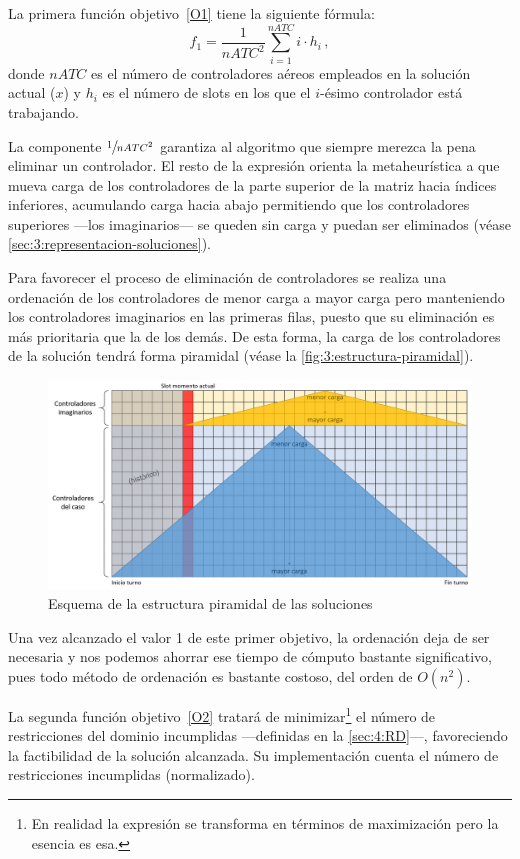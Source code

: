 La primera función objetivo~\ref{O1} tiene la siguiente fórmula:
\[ f_1 = \frac{1}{nATC^2} \sum_{i=1}^{nATC} i\cdot h_i \,, \]
donde $nATC$ es el número de controladores aéreos empleados en la solución actual ($x$) y $h_i$ es el número de slots en los que el $i$-ésimo controlador está trabajando. 

La componente $\sfrac{1}{nATC^2}$ garantiza al algoritmo que siempre merezca la pena eliminar un controlador. El resto de la expresión orienta la metaheurística a que mueva carga de los controladores de la parte superior de la matriz hacia índices inferiores, acumulando carga hacia abajo permitiendo que los controladores superiores ---los imaginarios--- se queden sin carga y puedan ser eliminados (véase \autoref{sec:3:representacion-soluciones}).

Para favorecer el proceso de eliminación de controladores se realiza una ordenación de los controladores de menor carga a mayor carga pero manteniendo los controladores imaginarios en las primeras filas, puesto que su eliminación es más prioritaria que la de los demás. De esta forma, la carga de los controladores de la solución tendrá forma piramidal (véase la \autoref{fig:3:estructura-piramidal}).

\begin{figure}
	\centering
	\includegraphics[width=\linewidth]{capitulos/Capitulo3-Metodologia-propuesta/recursos/estructura-piramidal}
	\caption{Esquema de la estructura piramidal de las soluciones}
	\label{fig:3:estructura-piramidal}
\end{figure}

Una vez alcanzado el valor 1 de este primer objetivo, la ordenación deja de ser necesaria y nos podemos ahorrar ese tiempo de cómputo bastante significativo, pues todo método de ordenación es bastante costoso, del orden de $O(n^2)$.

La segunda función objetivo~\ref{O2} tratará de minimizar\footnote{En realidad la expresión se transforma en términos de maximización pero la esencia es esa.} el número de restricciones del dominio incumplidas ---definidas en la \autoref{sec:4:RD}---, favoreciendo la factibilidad de la solución alcanzada. Su implementación cuenta el número de restricciones incumplidas (normalizado).

